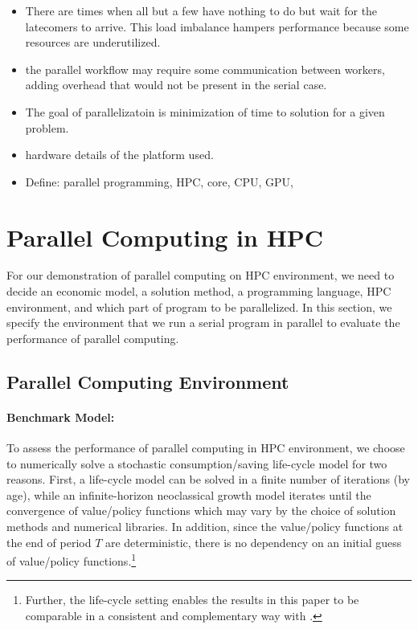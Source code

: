 \documentclass[12pt]{article}
\begin{document}
\begin{itemize}
\item There are times when all but a few have nothing to do but wait for the latecomers to arrive. This load imbalance hampers performance because some resources are underutilized.
\item the parallel workflow may require some communication between workers, adding overhead that would not be present in the serial case.
\item The goal of parallelizatoin is minimization of time to solution for a given problem.
\item hardware details of the platform used.
\item Define: parallel programming, HPC, core, CPU, GPU, 
\end{itemize}

\section{Parallel Computing in HPC}
For our demonstration of parallel computing on HPC environment, we need to decide an economic model, a solution method, a programming language, HPC environment, and which part of program to be parallelized. In this section, we specify the environment that we run a serial program in parallel to evaluate the performance of parallel computing.



\subsection{Parallel Computing Environment}
\paragraph{Benchmark Model:}
To assess the performance of parallel computing in HPC environment, we choose to numerically solve a stochastic consumption/saving life-cycle model for two reasons. First, a life-cycle model can be solved in a finite number of iterations (by age), while an infinite-horizon neoclassical growth model iterates until the convergence of value/policy functions which may vary by the choice of solution methods and numerical libraries. In addition, since the value/policy functions at the end of period $T$ are deterministic, there is no dependency on an initial guess of value/policy functions.\footnote{\sf Further, the life-cycle setting enables the results in this paper to be comparable in a consistent and complementary way with \cite{Fernandez-Villaverde-Valencia-18}.}
\end{document}
